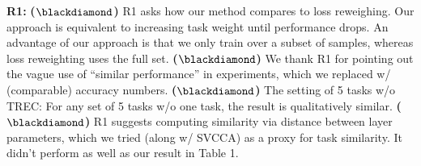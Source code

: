 \documentclass{article}
\begin{document}
\textbf{R1:}
\textbf{($\blackdiamond$)} R1 asks how our method compares to loss reweighing.
Our approach is equivalent to increasing task weight until performance drops.
An advantage of our approach is that we only train over a subset of samples, whereas loss reweighting uses the full set.
\textbf{($\blackdiamond$)} We thank R1 for pointing out the vague use of ``similar performance'' in experiments, which we replaced w/ (comparable) accuracy numbers. %
\textbf{($\blackdiamond$)} The setting of 5 tasks w/o TREC: For any set of 5 tasks w/o one task, the result is qualitatively similar.
\textbf{($\blackdiamond$)} R1 suggests computing similarity via distance between layer parameters,
which we tried (along w/ SVCCA) as a proxy for task similarity.
It didn't perform as well as our result in Table 1.


%
\end{document}
